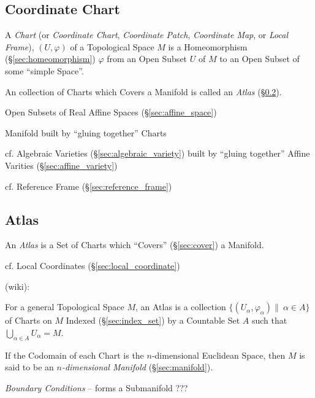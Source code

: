 \subsection{Coordinate Chart}\label{sec:coordinate_chart}

A \emph{Chart} (or \emph{Coordinate Chart}, \emph{Coordinate Patch},
\emph{Coordinate Map}, or \emph{Local Frame}), $(U, \varphi)$ of a Topological
Space $M$ is a Homeomorphism (\S\ref{sec:homeomorphism}) $\varphi$ from an Open
Subset $U$ of $M$ to an Open Subset of some ``simple Space''.

An collection of Charts which Covers a Manifold is called an \emph{Atlas}
(\S\ref{sec:atlas}).

Open Subsets of Real Affine Spaces (\S\ref{sec:affine_space})

Manifold built by ``gluing together'' Charts

cf. Algebraic Varieties (\S\ref{sec:algebraic_variety}) built by ``gluing
together'' Affine Varities (\S\ref{sec:affine_variety})

\fist cf. Reference Frame (\S\ref{sec:reference_frame})



\subsection{Atlas}\label{sec:atlas}

An \emph{Atlas} is a Set of Charts which ``Covers'' (\S\ref{sec:cover}) a
Manifold.

\fist cf. Local Coordinates (\S\ref{sec:local_coordinate})

(wiki):

For a general Topological Space $M$, an Atlas is a collection $\{(U_\alpha,
\varphi_\alpha) \|\ \alpha \in A \}$ of Charts on $M$ Indexed
(\S\ref{sec:index_set}) by a Countable Set $A$ such that
$\bigcup_{\alpha\in{A}} U_\alpha = M$.

If the Codomain of each Chart is the $n$-dimensional Euclidean Space, then $M$
is said to be an \emph{$n$-dimensional Manifold} (\S\ref{sec:manifold}).

\emph{Boundary Conditions} -- forms a Submanifold ???



